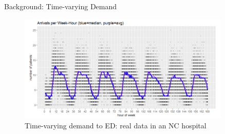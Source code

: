 \documentclass[smaller ,table,usenames,dvipsnames]{beamer}
\newcommand{\?}{\stackrel{?}{=}}
\begin{document}
\begin{frame}{Background: Time-varying Demand}
    \begin{figure}
        \centering
        \includegraphics[width=0.9\textwidth]{./Figures/ED_demand}
        \caption*{Time-varying demand to ED: real data in an NC hospital}
        \label{fig:time_varying_demand}
    \end{figure}
    
\end{frame}

\end{document}
